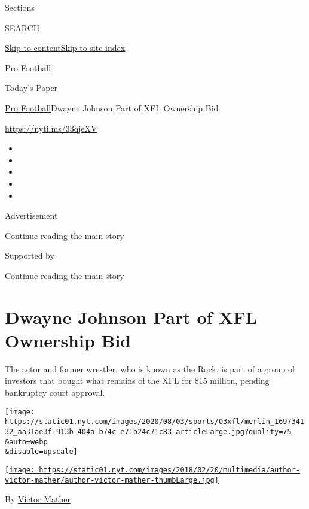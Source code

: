 Sections

SEARCH

\protect\hyperlink{site-content}{Skip to
content}\protect\hyperlink{site-index}{Skip to site index}

\href{https://www.nytimes.com/section/sports/football}{Pro Football}

\href{https://myaccount.nytimes.com/auth/login?response_type=cookie\&client_id=vi}{}

\href{https://www.nytimes.com/section/todayspaper}{Today's Paper}

\href{/section/sports/football}{Pro Football}\textbar{}Dwayne Johnson
Part of XFL Ownership Bid

\url{https://nyti.ms/33qjeXV}

\begin{itemize}
\item
\item
\item
\item
\item
\end{itemize}

Advertisement

\protect\hyperlink{after-top}{Continue reading the main story}

Supported by

\protect\hyperlink{after-sponsor}{Continue reading the main story}

\hypertarget{dwayne-johnson-part-of-xfl-ownership-bid}{%
\section{Dwayne Johnson Part of XFL Ownership
Bid}\label{dwayne-johnson-part-of-xfl-ownership-bid}}

The actor and former wrestler, who is known as the Rock, is part of a
group of investors that bought what remains of the XFL for \$15 million,
pending bankruptcy court approval.

\texttt{[image: https://static01.nyt.com/images/2020/08/03/sports/03xfl/merlin\_169734132\_aa31ae3f-913b-404a-b74c-e71b24c71c83-articleLarge.jpg?quality=75\\\&auto=webp\\\&disable=upscale]}

\href{https://www.nytimes.com/by/victor-mather}{\texttt{[image: https://static01.nyt.com/images/2018/02/20/multimedia/author-victor-mather/author-victor-mather-thumbLarge.jpg]}}

By \href{https://www.nytimes.com/by/victor-mather}{Victor Mather}

